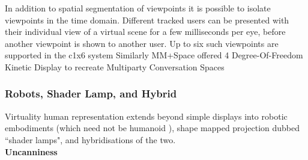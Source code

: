 In addition to spatial segmentation of viewpoints \cite{gotsch2018telehuman2} it is possible to isolate viewpoints in the time domain. Different tracked users can be presented with their individual view of a virtual scene for a few milliseconds per eye, before another viewpoint is shown to another user. Up to six such viewpoints are supported in the c1x6 system \cite{Kulik2011}
Similarly MM+Space offered 4 Degree-Of-Freedom Kinetic Display to recreate Multiparty Conversation Spaces \cite{Otsuka2013}
            \subsubsection{Robots, Shader Lamp, and Hybrid}
                Virtuality human representation extends beyond simple displays into robotic embodiments (which need not be humanoid \cite{Marti2005}), shape mapped projection dubbed ``shader lamps", and hybridisations of the two.\\ 
                
				\textbf{Uncanniness}
				
